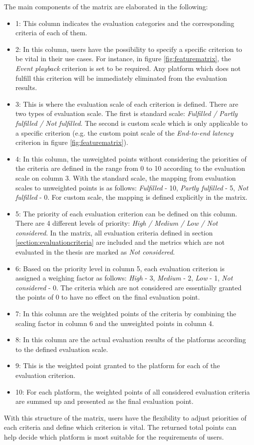 The main components of the matrix are elaborated in the following:
\begin{itemize}
	\item 1: This column indicates the evaluation categories and the corresponding criteria of each of them.
	\item 2: In this column, users have the possibility to specify a specific criterion to be vital in their use cases. For instance, in figure \ref{fig:featurematrix}, the \emph{Event playback} criterion is set to be required. Any platform which does not fulfill this criterion will be immediately eliminated from the evaluation results.
	\item 3: This is where the evaluation scale of each criterion is defined. There are two types of evaluation scale. The first is standard scale: \emph{Fulfilled / Partly fulfilled / Not fulfilled}. The second is custom scale which is only applicable to a specific criterion (e.g. the custom point scale of the \emph{End-to-end latency} criterion in figure \ref{fig:featurematrix}). 
	\item 4: In this column, the unweighted points without considering the priorities of the criteria are defined in the range from 0 to 10 according to the evaluation scale on column 3. With the standard scale, the mapping from evaluation scales to unweighted points is as follows: \emph{Fulfilled} - 10, \emph{Partly fulfilled} - 5, \emph{Not fulfilled} - 0. For custom scale, the mapping is defined explicitly in the matrix. 
	\item 5: The priority of each evaluation criterion can be defined on this column. There are 4 different levels of priority: \emph{High / Medium / Low / Not considered}. In the matrix, all evaluation criteria defined in section \ref{section:evaluationcriteria} are included and the metrics which are not evaluated in the thesis are marked as \emph{Not considered}.
	\item 6: Based on the priority level in column 5, each evaluation criterion is assigned a weighing factor as follows: \emph{High} - 3, \emph{Medium} - 2, \emph{Low} - 1, \emph{Not considered} - 0. The criteria which are not considered are essentially granted the points of 0 to have no effect on the final evaluation point.
	\item 7: In this column are the weighted points of the criteria by combining the scaling factor in column 6 and the unweighted points in column 4.
	\item 8: In this column are the actual evaluation results of the platforms according to the defined evaluation scale.
	\item 9: This is the weighted point granted to the platform for each of the evaluation criterion.
	\item 10: For each platform, the weighted points of all considered evaluation criteria are summed up and presented as the final evaluation point.  
\end{itemize}

With this structure of the matrix, users have the flexibility to adjust priorities of each criteria and define which criterion is vital. The returned total points can help decide which platform is most suitable for the requirements of users.